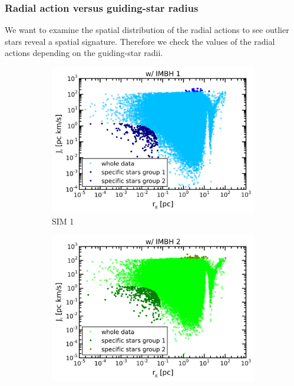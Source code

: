 \subsubsection{Radial action versus guiding-star radius}
\par We want to examine the spatial distribution of the radial actions to see outlier stars reveal a spatial signature. Therefore we check the values of the radial actions depending on the guiding-star radii.
\begin{figure}[htbp]
\centering
	\begin{subfigure}{0.475\textwidth}
		\centering
		\includegraphics[width=\textwidth]{Plots/r_g_J_r_IMBH1.png}
		\caption{SIM 1}
		\label{fig:r_g_J_r_IMBH1}
	\end{subfigure}
	\hfill
	\begin{subfigure}{0.475\textwidth}
		\centering
		\includegraphics[width=\textwidth]{Plots/r_g_J_r_IMBH2.png}

\end{subfigure}
\end{figure}
